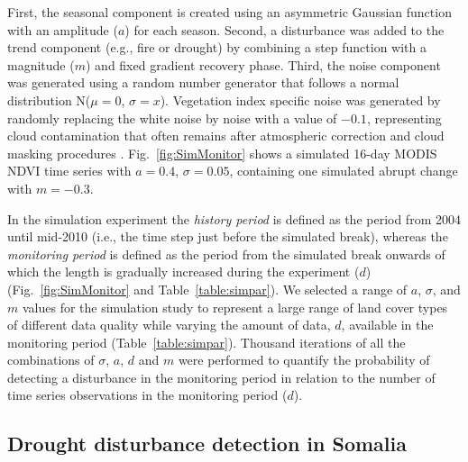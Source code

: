 \documentclass[authoryear,preprint,review,10pt]{elsarticle}
\begin{document}
First, the seasonal component is created using an asymmetric Gaussian function with an amplitude ($a$) for each season. Second, a disturbance was added to the trend component (e.g., fire or drought) by combining a step function with a magnitude ($m$) and fixed gradient recovery phase. Third, the noise component was generated using a random number generator that follows a normal distribution N($\mu = 0$, $\sigma =x$). Vegetation index specific noise was generated by randomly replacing the white noise by noise with a value of $-0.1$, representing cloud contamination that often remains after atmospheric correction and cloud masking procedures \citep[see][for more details]{Verbesselt:2010wo}. Fig.~\ref{fig:SimMonitor} shows a simulated 16-day MODIS NDVI time series with $a = 0.4$, $\sigma = 0.05$, containing one simulated abrupt change with $m = -0.3$.

In the simulation experiment the \emph{history period} is defined as the period from 2004 until mid-2010 (i.e., the time step just before the simulated break), whereas the \emph{monitoring period} is defined as the period from the simulated break onwards of which the length is gradually increased during the experiment ($d$) (Fig.~\ref{fig:SimMonitor} and Table~\ref{table:simpar}). We selected a range of $a$, $\sigma$, and $m$ values for the simulation study to represent a large range of land cover types of different data quality while varying the amount of data, $d$, available in the monitoring period (Table~\ref{table:simpar}). Thousand iterations of all the combinations of $\sigma$, $a$, $d$ and $m$ were performed to quantify the probability of detecting a disturbance in the monitoring period in relation to the number of time series observations in the monitoring period ($d$).

\subsection{Drought disturbance detection in Somalia}\label{sec:RealData}
\end{document}
